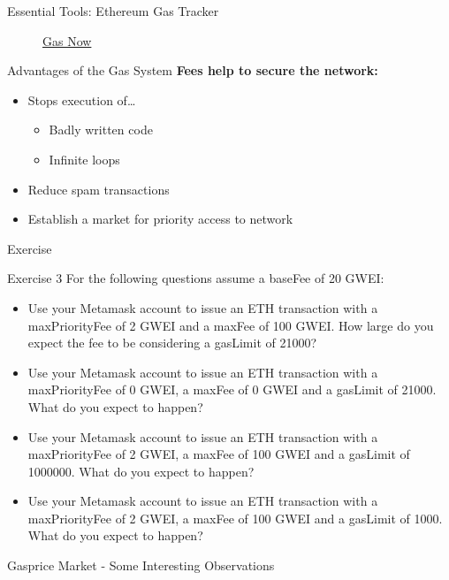 \documentclass[]{beamer}
\begin{document}
\begin{frame}{Essential Tools: Ethereum Gas Tracker}
\begin{figure}
\begin{minipage}{0.45\textwidth}
  			\caption*{\footnotesize \href{https://www.gasnow.org}{\link Gas Now}}			
		\end{minipage}
	\end{figure}
\end{frame}

\begin{frame}{Advantages of the Gas System}
	\textbf{Fees help to secure the network:}
	\begin{itemize}
		\item Stops execution of…
		\begin{itemize}
			\item Badly written code
			\item Infinite loops
		\end{itemize}
		\item Reduce spam transactions
		\item Establish a market for priority access to network
	\end{itemize}
\end{frame}	

\begin{frame}{Exercise}
	\begin{exercise}{Exercise 3}
	For the following questions assume a baseFee of 20 GWEI:
	\begin{itemize}
		\item Use your Metamask account to issue an ETH transaction with a maxPriorityFee of 2 GWEI and a maxFee of 100 GWEI. How large do you expect the fee to be considering a gasLimit of 21000?
		\item Use your Metamask account to issue an ETH transaction with a maxPriorityFee of 0 GWEI, a maxFee of 0 GWEI and a gasLimit of 21000. What do you expect to happen?
		\item Use your Metamask account to issue an ETH transaction with a maxPriorityFee of 2 GWEI, a maxFee of 100 GWEI and a gasLimit of 1000000. What do you expect to happen?
		\item Use your Metamask account to issue an ETH transaction with a maxPriorityFee of 2 GWEI, a maxFee of 100 GWEI and a gasLimit of 1000. What do you expect to happen?
	\end{itemize}
	\end{exercise}
\end{frame}

\begin{frame}{Gasprice Market - Some Interesting Observations}
	\begin{center}
	\begin{tikzpicture}
		
	\end{tikzpicture}
	\end{center}
\end{frame}
\end{document}
